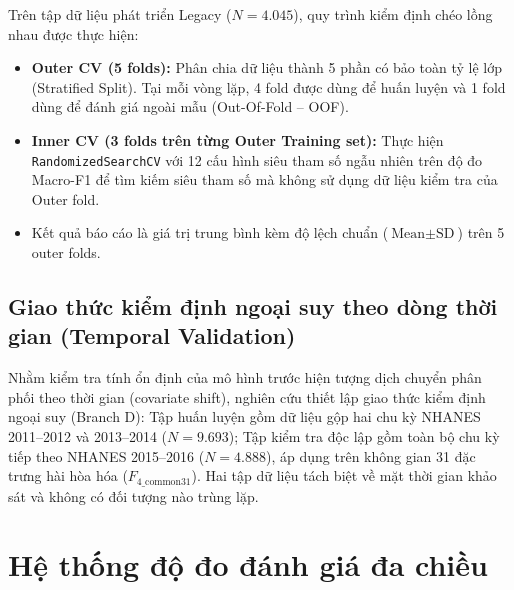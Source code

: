 Trên tập dữ liệu phát triển Legacy ($N = 4.045$), quy trình kiểm định chéo lồng nhau được thực hiện:
\begin{itemize}
    \item \textbf{Outer CV (5 folds):} Phân chia dữ liệu thành 5 phần có bảo toàn tỷ lệ lớp (Stratified Split). Tại mỗi vòng lặp, 4 fold được dùng để huấn luyện và 1 fold dùng để đánh giá ngoài mẫu (Out-Of-Fold -- OOF).
    \item \textbf{Inner CV (3 folds trên từng Outer Training set):} Thực hiện \texttt{RandomizedSearchCV} với 12 cấu hình siêu tham số ngẫu nhiên trên độ đo Macro-F1 để tìm kiếm siêu tham số mà không sử dụng dữ liệu kiểm tra của Outer fold.
    \item Kết quả báo cáo là giá trị trung bình kèm độ lệch chuẩn ($\text{Mean} \pm \text{SD}$) trên 5 outer folds.
\end{itemize}

\subsection{Giao thức kiểm định ngoại suy theo dòng thời gian (Temporal Validation)}
\label{subsec:temporal-protocol}

Nhằm kiểm tra tính ổn định của mô hình trước hiện tượng dịch chuyển phân phối theo thời gian (covariate shift), nghiên cứu thiết lập giao thức kiểm định ngoại suy (Branch D): Tập huấn luyện gồm dữ liệu gộp hai chu kỳ NHANES 2011--2012 và 2013--2014 ($N = 9.693$); Tập kiểm tra độc lập gồm toàn bộ chu kỳ tiếp theo NHANES 2015--2016 ($N = 4.888$), áp dụng trên không gian 31 đặc trưng hài hòa hóa ($F_{4\_\text{common31}}$). Hai tập dữ liệu tách biệt về mặt thời gian khảo sát và không có đối tượng nào trùng lặp.

\section{Hệ thống độ đo đánh giá đa chiều}
\label{sec:he-thong-do-do}

